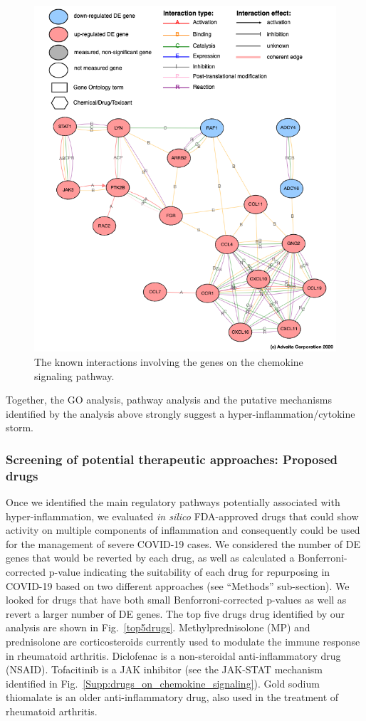 \documentclass[Minh_PhD_thesis.tex]{subfiles}
\begin{document}
\begin{figure}
\centering
	\includegraphics[width=0.8\linewidth]{../Figures/chemokine_signaling_mechanism.png}
    \caption{The known interactions involving the genes on the chemokine signaling pathway. }
        \label{Supp:chemokine_signaling_mechanism}
\end{figure}


Together, the GO analysis, pathway analysis and the putative mechanisms identified by the analysis above strongly  suggest a hyper-inflammation/cytokine storm.
\color{black} 


\subsubsection{Screening of potential therapeutic approaches: Proposed drugs}  

Once we identified the main regulatory pathways potentially associated with hyper-inflammation, we evaluated \emph{in silico} FDA-approved drugs that could show activity on multiple components of inflammation and consequently could be used for the management of severe COVID-19 cases. We considered the number of DE genes that would be reverted by each drug, as well as calculated a Bonferroni-corrected p-value indicating the suitability of each drug for repurposing in COVID-19 based on two different approaches (see ``Methods'' sub-section). We looked for drugs that have both small Benforroni-corrected p-values as well as revert a larger number of DE genes. 
The top five drugs drug identified by our analysis are shown in Fig.~\ref{top5drugs}. Methylprednisolone (MP) and prednisolone are corticosteroids currently used to modulate the immune response in rheumatoid arthritis.  Diclofenac is a non-steroidal anti-inflammatory drug (NSAID). Tofacitinib is a JAK inhibitor (see the JAK-STAT mechanism identified in  Fig.~\ref{Supp:drugs_on_chemokine_signaling}). Gold sodium thiomalate is an older anti-inflammatory drug, also used in the treatment of rheumatoid arthritis. 
\end{document}
